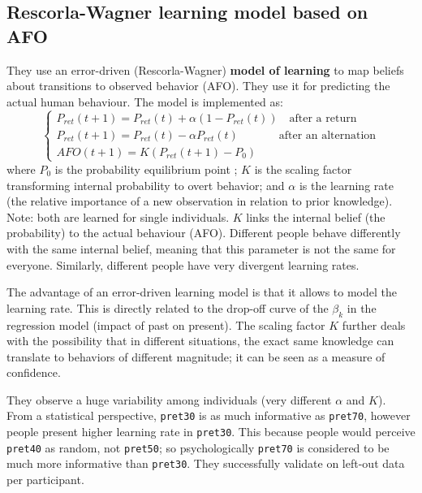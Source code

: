 \subsection{Rescorla-Wagner learning model based on AFO}
They use an error-driven (Rescorla-Wagner) \textbf{model of learning} to map beliefs about transitions to observed behavior (AFO). They use it for predicting the actual human behaviour. The model is implemented as:
\[
\begin{cases}
    P_{ret}(t+1) = P_{ret}(t) + \alpha(1-P_{ret}(t)) \quad \text{after a return}\\
    P_{ret}(t+1) = P_{ret}(t) - \alpha P_{ret}(t) \quad \quad \quad \;\; \text{after an alternation}\\
    AFO(t+1) = K(P_{ret}(t+1)-P_0)
\end{cases}
\]
where $P_0$ is the probability equilibrium point \notet; $K$ is the scaling factor transforming internal probability to overt behavior; and $\alpha$ is the learning rate (the relative importance of a new observation in relation to prior knowledge). Note: both are learned for single individuals. $K$ links the internal belief (the probability) to the actual behaviour (AFO). Different people behave differently with the same internal belief, meaning that this parameter is not the same for everyone. Similarly, different people have very divergent learning rates.

The advantage of an error-driven learning model is that it allows to model the learning rate. This is directly related to the drop-off curve of the $\beta_k$ in the regression model (impact of past on present). The scaling factor $K$ further deals with the possibility that in different situations, the exact same knowledge can translate to behaviors of different magnitude; it can be seen as a measure of confidence.


They observe a huge variability among individuals (very different $\alpha$ and $K$). From a statistical perspective, \texttt{pret30} is as much informative as \texttt{pret70}, however people present higher learning rate in \texttt{pret30}. This because people would perceive \texttt{pret40} as random, not \texttt{pret50}; so psychologically \texttt{pret70} is considered to be much more informative than \texttt{pret30}.
They successfully validate on left-out data per participant.

